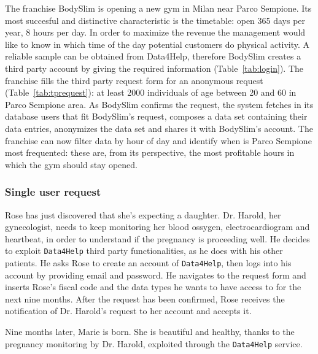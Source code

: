       The franchise BodySlim is opening a new gym in Milan near Parco Sempione. Its most succesful and distinctive characteristic is the timetable: open 365 days per year, 8 hours per day. In order to maximize the revenue the management would like to know in which time of the day potential customers do physical activity. A reliable sample can be obtained from Data4Help, therefore BodySlim creates a third party account by giving the required information (Table~\ref{tab:login}). The franchise fills the third party request form for an anonymous request (Table~\ref{tab:tprequest}): at least 2000 individuals of age between 20 and 60 in Parco Sempione area. As BodySlim confirms the request, the system fetches in its database users that fit BodySlim's request, composes a data set containing their data entries, anonymizes the data set and shares it with BodySlim's account. The franchise can now filter data by hour of day and identify when is Parco Sempione most frequented: these are, from its perspective, the most profitable hours in which the gym should stay opened.


    \subsubsection{Single user request}

      Rose has just discovered that she's expecting a daughter. Dr. Harold, her gynecologist, needs to keep monitoring her blood ossygen, electrocardiogram and heartbeat, in order to understand if the pregnancy is proceeding well. He decides to exploit \texttt{Data4Help} third party functionalities, as he does with his other patients. He asks Rose to create an account of \texttt{Data4Help}, then logs into his account by providing email and password. He navigates to the request form and inserts Rose's fiscal code and the data types he wants to have access to for the next nine months. After the request has been confirmed, Rose receives the notification of Dr. Harold's request to her account and accepts it.

      Nine months later, Marie is born. She is beautiful and healthy, thanks to the pregnancy monitoring by Dr. Harold, exploited through the \texttt{Data4Help} service.


